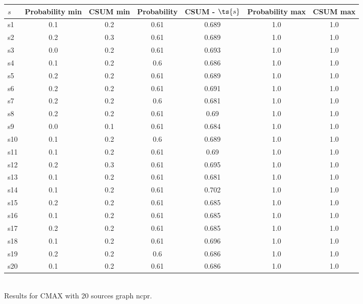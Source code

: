 \documentclass{article}
\begin{document}
\noindent\begin{tabular}{|l|c|c|c|c|c|c|}
\hline
$s$& Probability min & CSUM min & Probability & CSUM - $\ts{s}$ & Probability max & CSUM max\\
\hline
s1 &0.1 & 0.2 & 0.61 & 0.689 & 1.0 & 1.0\\
\hline
s2 &0.2 & 0.3 & 0.61 & 0.689 & 1.0 & 1.0\\
\hline
s3 &0.0 & 0.2 & 0.61 & 0.693 & 1.0 & 1.0\\
\hline
s4 &0.1 & 0.2 & 0.6 & 0.686 & 1.0 & 1.0\\
\hline
s5 &0.2 & 0.2 & 0.61 & 0.689 & 1.0 & 1.0\\
\hline
s6 &0.2 & 0.2 & 0.61 & 0.691 & 1.0 & 1.0\\
\hline
s7 &0.2 & 0.2 & 0.6 & 0.681 & 1.0 & 1.0\\
\hline
s8 &0.2 & 0.2 & 0.61 & 0.69 & 1.0 & 1.0\\
\hline
s9 &0.0 & 0.1 & 0.61 & 0.684 & 1.0 & 1.0\\
\hline
s10 &0.1 & 0.2 & 0.6 & 0.689 & 1.0 & 1.0\\
\hline
s11 &0.1 & 0.2 & 0.61 & 0.69 & 1.0 & 1.0\\
\hline
s12 &0.2 & 0.3 & 0.61 & 0.695 & 1.0 & 1.0\\
\hline
s13 &0.1 & 0.2 & 0.61 & 0.681 & 1.0 & 1.0\\
\hline
s14 &0.1 & 0.2 & 0.61 & 0.702 & 1.0 & 1.0\\
\hline
s15 &0.2 & 0.2 & 0.61 & 0.685 & 1.0 & 1.0\\
\hline
s16 &0.1 & 0.2 & 0.61 & 0.685 & 1.0 & 1.0\\
\hline
s17 &0.2 & 0.2 & 0.61 & 0.685 & 1.0 & 1.0\\
\hline
s18 &0.1 & 0.2 & 0.61 & 0.696 & 1.0 & 1.0\\
\hline
s19 &0.2 & 0.2 & 0.6 & 0.686 & 1.0 & 1.0\\
\hline
s20 &0.1 & 0.2 & 0.61 & 0.686 & 1.0 & 1.0\\
\hline
\end{tabular}\\

\noindent Results for CMAX with 20 sources graph ncpr.
\end{document}

